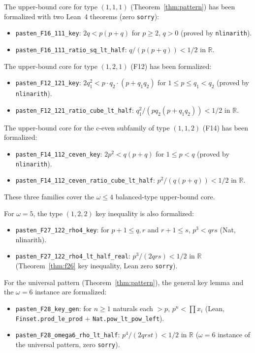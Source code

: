 \documentclass[12pt]{article}
\theoremstyle{definition}
\begin{document}
The upper-bound core for type $(1,1,1)$ (Theorem~\ref{thm:pattern}) has
been formalized with two Lean~4 theorems (zero \texttt{sorry}):
\begin{itemize}
  \item \texttt{pasten\_F16\_111\_key}: $2q < p(p+q)$ for $p \ge 2$, $q > 0$
    (proved by \texttt{nlinarith}).
  \item \texttt{pasten\_F16\_111\_ratio\_sq\_lt\_half}:
    $q / (p(p+q)) < 1/2$ in $\mathbb{R}$.
\end{itemize}

The upper-bound core for type $(1,2,1)$ (F12) has been formalized:
\begin{itemize}
  \item \texttt{pasten\_F12\_121\_key}: $2q_1^2 < p \cdot q_2 \cdot (p + q_1 q_2)$
    for $1 \le p \le q_1 < q_2$ (proved by \texttt{nlinarith}).
  \item \texttt{pasten\_F12\_121\_ratio\_cube\_lt\_half}:
    $q_1^2 / (p q_2 (p + q_1 q_2)) < 1/2$ in $\mathbb{R}$.
\end{itemize}

The upper-bound core for the c-even subfamily of type $(1,1,2)$ (F14) has been formalized:
\begin{itemize}
  \item \texttt{pasten\_F14\_112\_ceven\_key}: $2p^2 < q(p+q)$ for $1 \le p < q$
    (proved by \texttt{nlinarith}).
  \item \texttt{pasten\_F14\_112\_ceven\_ratio\_cube\_lt\_half}:
    $p^2 / (q(p+q)) < 1/2$ in $\mathbb{R}$.
\end{itemize}

These three families cover the $\omega \le 4$ balanced-type upper-bound core.

For $\omega=5$, the type $(1,2,2)$ key inequality is also formalized:
\begin{itemize}
  \item \texttt{pasten\_F27\_122\_rho4\_key}: for $p{+}1\le q,r$ and $r{+}1\le s$,
    $p^3 < qrs$ (Nat, nlinarith).
  \item \texttt{pasten\_F27\_122\_rho4\_lt\_half\_real}: $p^3/(2qrs) < 1/2$ in $\mathbb{R}$
    (Theorem~\ref{thm:f26} key inequality, Lean zero \texttt{sorry}).
\end{itemize}

For the universal pattern (Theorem~\ref{thm:pattern}), the general key lemma and the $\omega=6$
instance are formalized:
\begin{itemize}
  \item \texttt{pasten\_F28\_key\_gen}: for $n \ge 1$ naturals each $> p$,
    $p^n < \prod x_i$ (Lean, \texttt{Finset.prod\_le\_prod} + \texttt{Nat.pow\_lt\_pow\_left}).
  \item \texttt{pasten\_F28\_omega6\_rho\_lt\_half}: $p^4/(2qrst) < 1/2$ in $\mathbb{R}$
    ($\omega=6$ instance of the universal pattern, zero \texttt{sorry}).
\end{itemize}
\end{document}
